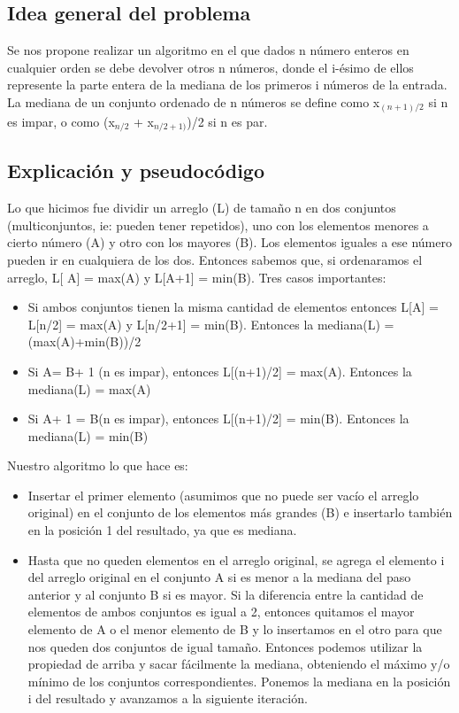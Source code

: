 \subsection{Idea general del problema}
Se nos propone realizar un algoritmo en el que dados n número enteros en cualquier orden se debe devolver otros n números, donde el i-ésimo de ellos represente la parte entera de la mediana de los primeros i números de la entrada.
La mediana de un conjunto ordenado de n números se define como x$_{(n+1)/2}$ si n es impar, o como (x$_{n/2}$ + x$_{n/2+1)}$)/2  si n es par.
\subsection{Explicación y pseudocódigo}

Lo que hicimos fue dividir un arreglo (L) de tamaño n en dos conjuntos (multiconjuntos, ie: pueden tener repetidos), uno con los elementos menores a cierto número (A) y otro con los mayores (B). Los elementos iguales a ese número pueden ir en cualquiera de los dos. Entonces sabemos que, si ordenaramos el arreglo, L[ \textbar A\textbar] = max(A) y L[\textbar A\textbar+1] = min(B). Tres casos importantes: 

\begin{itemize}
\item Si ambos conjuntos tienen la misma cantidad de elementos entonces L[\textbar A\textbar] = L[n/2] = max(A) y L[n/2+1] = min(B). Entonces la mediana(L) = (max(A)+min(B))/2
\item Si \textbar A\textbar = \textbar B\textbar + 1 (n es impar), entonces L[(n+1)/2] = max(A). Entonces la mediana(L) = max(A)
\item Si \textbar A\textbar + 1 = \textbar B\textbar (n es impar), entonces L[(n+1)/2] = min(B). Entonces la mediana(L) = min(B)
\end{itemize}


Nuestro algoritmo lo que hace es: 
\begin{itemize}
\item Insertar el primer elemento (asumimos que no puede ser vacío el arreglo original) en el conjunto de los elementos más grandes (B) e insertarlo también en la posición 1 del resultado, ya que es mediana.
\item Hasta que no queden elementos en el arreglo original, se agrega el elemento i del arreglo original en el conjunto A si es menor a la mediana del paso anterior y al conjunto B si es mayor. Si la diferencia entre la cantidad de elementos de ambos conjuntos es igual a 2, entonces quitamos el mayor elemento de A o el menor elemento de B y lo insertamos en el otro para que nos queden dos conjuntos de igual tamaño. Entonces podemos utilizar la propiedad de arriba y sacar fácilmente la mediana, obteniendo el máximo y/o mínimo de los conjuntos correspondientes. Ponemos la mediana en la posición i del resultado y avanzamos a la siguiente iteración.
\end{itemize}


